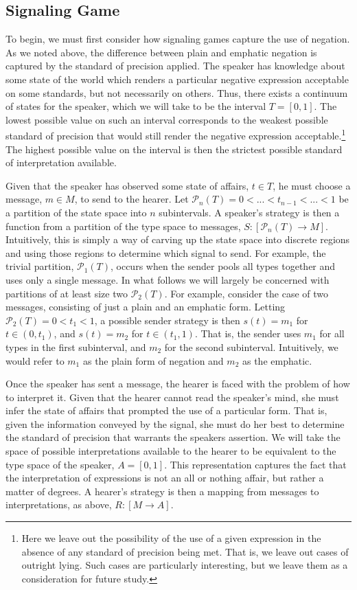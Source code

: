 \subsection{Signaling Game}

To begin, we must first consider how signaling games capture the use of negation. As we noted above, the difference between plain and emphatic negation is captured by the standard of precision applied. The speaker has knowledge about some state of the world which renders a particular negative expression acceptable on some standards, but not necessarily on others. Thus, there exists a continuum of states for the speaker, which we will take to be the interval $T = [0,1]$. The lowest possible value on such an interval corresponds to the weakest possible standard of precision that would still render the negative expression acceptable.\footnote{Here we leave out the possibility of the use of a given expression in the absence of any standard of precision being met. That is, we leave out cases of outright lying. Such cases are particularly interesting, but we leave them as a consideration for future study.} The highest possible value on the interval is then the strictest possible standard of 
interpretation available. 

Given that the speaker has observed some state of affairs, $t \in T$, he must choose a message, $m \in M$, to send to the hearer. Let $\mathcal{P}_n(T)= 0 < ... < t_{n-1} < ... < 1$ be a partition of the state space into $n$ subintervals.  A speaker's strategy is then a function from a partition of the type space to messages, $S : [\mathcal{P}_n(T) \rightarrow M]$. Intuitively, this is simply a way of carving up the state space into discrete regions and using those regions to determine which signal to send. For example, the trivial partition, $\mathcal{P}_1(T)$, occurs when the sender pools all types together and uses only a single message. In what follows we will largely be concerned with partitions of at least size two $\mathcal{P}_2(T)$. For example, consider the case of two messages, consisting of just a plain and an emphatic form. Letting $\mathcal{P}_2(T) = 0 < t_1 < 1$, a possible sender strategy is then  $s(t) = m_1$ for $t \in (0,t_1)$, and $s(t) = m_2$ for $t \in (t_1,1)$. That is, the sender uses 
$m_1$ for all types in the first subinterval, and $m_2$ for the second subinterval. Intuitively, we would refer to $m_1$ as the plain form of negation and $m_2$ as the emphatic.

Once the speaker has sent a message, the hearer is faced with the problem of how to interpret it. Given that the hearer cannot read the speaker's mind, she must infer the state of affairs that prompted the use of a particular form. That is, given the information conveyed by the signal, she must do her best to determine the standard of precision that warrants the speakers assertion. We will take the space of possible interpretations available to the hearer to be equivalent to the type space of the speaker, $A = [0,1]$. This representation captures the fact that the interpretation of expressions is not an all or nothing affair, but rather a matter of degrees.  A hearer's strategy is then a mapping from messages to interpretations, as above, $R : [M \rightarrow A]$.



